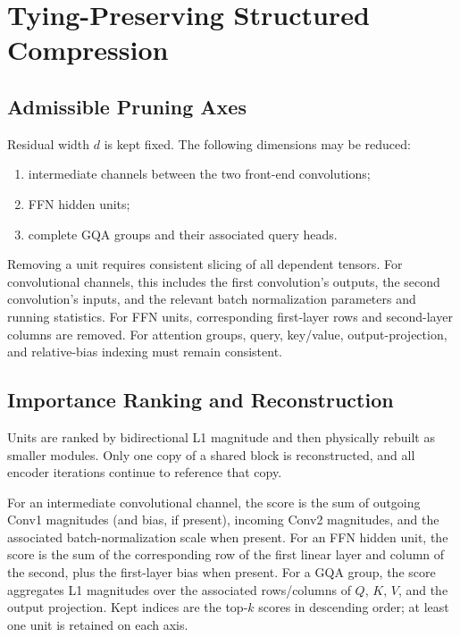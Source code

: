\documentclass[journal]{IEEEtran}
\begin{document}
\section{Tying-Preserving Structured Compression}

\subsection{Admissible Pruning Axes}

Residual width $d$ is kept fixed.
The following dimensions may be reduced:
\begin{enumerate}
  \item intermediate channels between the two front-end
  convolutions;
  \item FFN hidden units;
  \item complete GQA groups and their associated query heads.
\end{enumerate}

Removing a unit requires consistent slicing of all dependent
tensors.
For convolutional channels, this includes the first convolution's
outputs, the second convolution's inputs, and the relevant batch
normalization parameters and running statistics.
For FFN units, corresponding first-layer rows and second-layer
columns are removed.
For attention groups, query, key/value, output-projection, and
relative-bias indexing must remain consistent.

\subsection{Importance Ranking and Reconstruction}

Units are ranked by bidirectional L1 magnitude and then physically
rebuilt as smaller modules.
Only one copy of a shared block is reconstructed, and all encoder
iterations continue to reference that copy.

For an intermediate convolutional channel, the score is the sum of
outgoing Conv1 magnitudes (and bias, if present), incoming Conv2
magnitudes, and the associated batch-normalization scale when
present.
For an FFN hidden unit, the score is the sum of the corresponding
row of the first linear layer and column of the second, plus the
first-layer bias when present.
For a GQA group, the score aggregates L1 magnitudes over the
associated rows/columns of $Q$, $K$, $V$, and the output
projection.
Kept indices are the top-$k$ scores in descending order; at least
one unit is retained on each axis.
\end{document}
